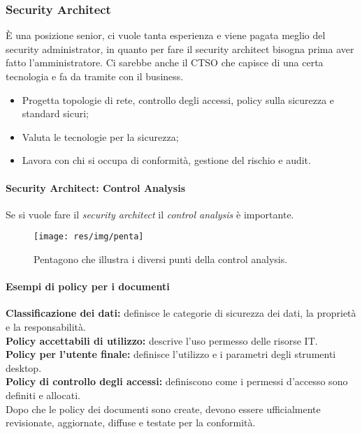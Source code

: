 \subsubsection{Security Architect}

È una posizione senior, ci vuole tanta esperienza e viene pagata meglio del
security administrator, in quanto per fare il security architect bisogna
prima aver fatto l'amministratore.
Ci sarebbe anche il CTSO che capisce di una certa tecnologia e fa da tramite
con il business.

\begin{itemize}
\item Progetta topologie di rete, controllo degli accessi, policy sulla
sicurezza e standard sicuri;
\item Valuta le tecnologie per la sicurezza;
\item Lavora con chi si occupa di conformità, gestione del rischio e audit.
\end{itemize}

\paragraph{Security Architect: Control Analysis}

Se si vuole fare il \textit{security architect} il \textit{control analysis} è
importante.

\begin{figure}[h!]
        \begin{center}
                \texttt{[image: res/img/penta]}
        \end{center}
        \caption{Pentagono che illustra i diversi punti della control analysis.}
\end{figure}

\paragraph*{Esempi di policy per i documenti}

\textbf{Classificazione dei dati:} definisce le categorie di sicurezza dei dati,
la proprietà e la responsabilità.\\
\newline
\textbf{Policy accettabili di utilizzo:} descrive l'uso permesso delle risorse
IT.\\
\newline
\textbf{Policy per l'utente finale:} definisce l'utilizzo e i parametri degli
strumenti desktop.\\
\newline
\textbf{Policy di controllo degli accessi:} definiscono come i permessi
d'accesso sono definiti e allocati.\\
\newline
Dopo che le policy dei documenti sono create, devono essere ufficialmente
revisionate, aggiornate, diffuse e testate per la conformità.
